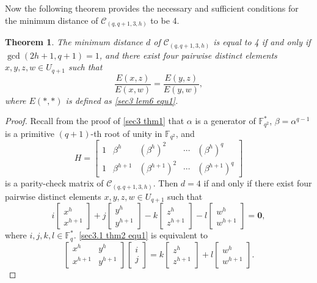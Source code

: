 \documentclass[10pt]{article}%
\newtheorem{theorem}{Theorem}%
\begin{document}
	Now the following theorem provides the necessary and sufficient conditions for the minimum distance of $\mathcal{C}_{(q,q+1,3,h)}$ to be 4.
	\begin{theorem}\label{sec3.1 thm2}
		The minimum distance $d$ of $\mathcal{C}_{(q,q+1,3,h)}$ is equal to 4 if and only if $\gcd(2h+1,q+1)=1$, and there exist four pairwise distinct elements $x,y,z,w\in U_{q+1}$ such that
		\begin{equation}\label{sec3.1 thm2 equ0}
			\frac{E(x,z)}{E(x,w)}=\frac{E(y,z)}{E(y,w)},
		\end{equation}
		where $E(\ast,\ast)$ is defined as \cref{sec3 lem6 equ1}.
	\end{theorem}
	\begin{proof}
		Recall from the proof of \cref{sec3 thm1} that $\alpha$ is a generator of $\mathbb{F}_{q^2}^{\ast}$, $\beta=\alpha^{q-1}$ is a primitive $(q+1)$-th root of unity in $\mathbb{F}_{q^2}$, and
		\begin{equation*}
			\left.H=\left[\begin{array}{lllll}1&\beta^{h}&(\beta^{h})^2&\cdots&(\beta^{h})^q\\1&\beta^{h+1}&(\beta^{h+1})^2&\cdots&(\beta^{h+1})^q\end{array}\right.\right]
		\end{equation*}
		is a parity-check matrix of $\mathcal{C}_{(q,q+1,3,h)}$. Then $d=4$ if and only if there exist four pairwise distinct elements $x,y,z,w\in U_{q+1}$ such that
		\begin{equation}
			\label{sec3.1 thm2 equ1}
			\left.i\left[\begin{array}{l}x^{h}\\x^{h+1}\end{array}\right.\right]+j\left[\begin{array}{l}y^{h}\\y^{h+1}\end{array}\right]-k\left[\begin{array}{l}z^{h}\\z^{h+1}\end{array}\right]-l\left[\begin{array}{l}w^{h}\\w^{h+1}\end{array}\right]=\mathbf{0},
		\end{equation}
		where $i,j,k,l\in\mathbb{F}_q^\ast$. \cref{sec3.1 thm2 equ1} is equivalent to
		\begin{equation}
			\label{sec3.1 thm2 equ2}
			\left.\left[\begin{array}{ll}x^{h} & y^{h}\\x^{h+1} & y^{h+1}\end{array}\right.\right]\left[\begin{array}{l}i\\j\end{array}\right]=k\left[\begin{array}{l}z^{h}\\z^{h+1}\end{array}\right]+l\left[\begin{array}{l}w^{h}\\w^{h+1}\end{array}\right].
		\end{equation}
		

\end{proof}
\end{document}
